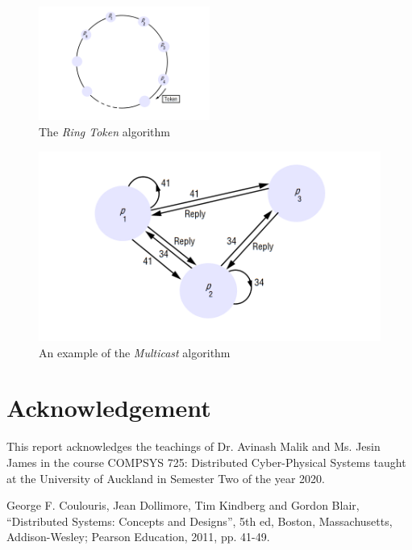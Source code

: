 \documentclass[conference]{IEEEtran}
\begin{document}
\begin{figure}[htbp]
  \centerline{\includegraphics[width=0.5\textwidth]{ring-token.png}}
  \caption{The \textit{Ring Token} algorithm}
\label{fig:ring-token}
\end{figure}

\begin{figure}[htbp]
  \centerline{\includegraphics[width=1.0\textwidth]{multicast.png}}
  \caption{\large An example of the \textit{Multicast} algorithm}
\label{fig:multicast}
\end{figure}

\section*{Acknowledgement}
This report acknowledges the teachings of Dr. Avinash Malik and Ms. Jesin James
in the course COMPSYS 725: Distributed Cyber-Physical Systems taught at the
University of Auckland in Semester Two of the year 2020.

\begin{thebibliography}{00}
 George F. Coulouris, Jean Dollimore, Tim Kindberg and Gordon
  Blair, ``Distributed Systems: Concepts and Designs'', 5th ed, Boston,
    Massachusetts, Addison-Wesley; Pearson Education, 2011, pp. 41-49.
\end{thebibliography}
\vspace{12pt}
\end{document}
